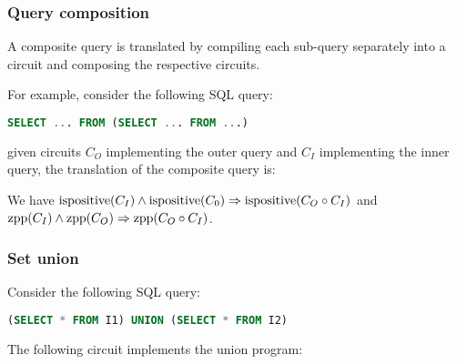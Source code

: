 \subsubsection{Query composition}

A composite query is translated by compiling each sub-query separately into a circuit
and composing the respective circuits.

For example, consider the following SQL query:

\begin{lstlisting}[language=SQL]
SELECT ... FROM (SELECT ... FROM ...)
\end{lstlisting}

\noindent given circuits $C_O$ implementing the outer query and $C_I$
implementing the inner query, the translation of the composite query is:

\begin{center}
\end{center}

We have $\mbox{ispositive}(C_I) \land \mbox{ispositive}(C_0) \Rightarrow \mbox{ispositive}(C_O \circ C_I)$
and $\mbox{zpp}(C_I) \land \mbox{zpp}(C_O) \Rightarrow \mbox{zpp}(C_O \circ C_I)$.

\subsubsection{Set union}

Consider the following SQL query:

\begin{lstlisting}[language=SQL]
(SELECT * FROM I1) UNION (SELECT * FROM I2)
\end{lstlisting}

The following circuit implements the union program:

\begin{center}
\end{center}

